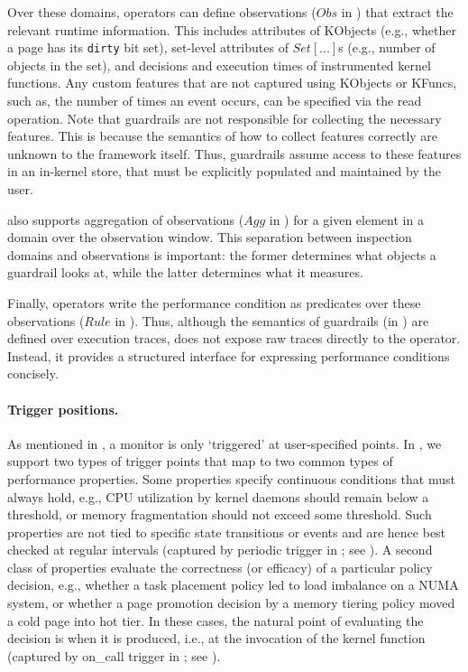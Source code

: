 Over these domains, operators can define observations ($Obs$ in ) that extract the relevant runtime information.
This includes attributes of {\sf KObject}s (e.g., whether a page has its {\tt dirty} bit set), set-level attributes of $Set[...]$s (e.g., number of objects in the set), and decisions and execution times of instrumented kernel functions.
Any custom features that are not captured using {\sf KObject}s or {\sf KFunc}s, such as, the number of times an event occurs, can be specified via the {\sf read} operation. 
Note that guardrails are not responsible for collecting the necessary features. This is because the semantics of how to collect features correctly are unknown to the framework itself.
Thus, guardrails assume access to these features in an in-kernel store, that must be explicitly populated and maintained by the user. 

\lang also supports aggregation of observations ($Agg$ in ) for a given element in a domain over the observation window.
This separation between inspection domains and observations is important: the former determines what objects a guardrail looks at, while the latter determines what it measures.

Finally, operators write the performance condition as predicates over these observations ($Rule$ in ).
Thus, although the semantics of guardrails (in ) are defined over execution traces, \lang does not expose raw traces directly to the operator.
Instead, it provides a structured interface for expressing performance conditions concisely.

\paragraph{Trigger positions.}
As mentioned in , a monitor is only `triggered' at user-specified points. In \lang, we support two types of trigger points that map to two common types of performance properties.
Some properties specify continuous conditions that must always hold, e.g., CPU utilization by kernel daemons should remain below a threshold, or memory fragmentation should not exceed some threshold.
Such properties are not tied to specific state transitions or events and are hence best checked at regular intervals (captured by {\sf periodic} trigger in \lang; see ).
A second class of properties evaluate the correctness (or efficacy) of a particular policy decision, e.g., whether a task placement policy led to load imbalance on a NUMA system, or whether a page promotion decision by a memory tiering policy moved a cold page into hot tier.
In these cases, the natural point of evaluating the decision is when it is produced, i.e., at the invocation of the kernel function (captured by {\sf on_call} trigger in \lang; see ).

